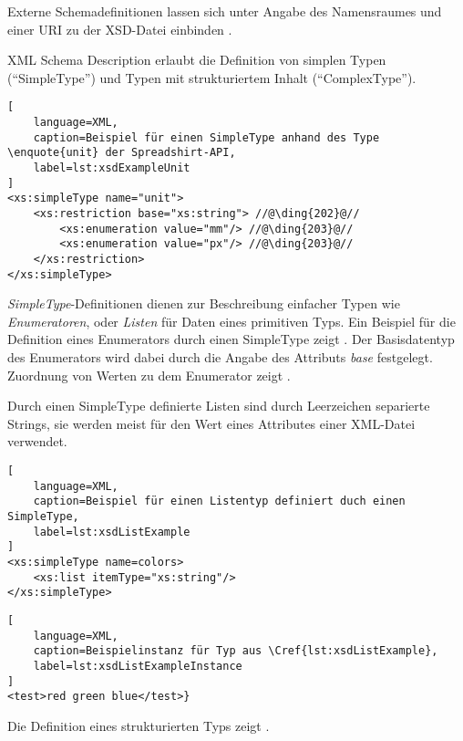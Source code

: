 Externe Schemadefinitionen lassen sich unter Angabe des Namensraumes und einer \gls{URI} zu der XSD-Datei einbinden .

XML Schema Description erlaubt die Definition von simplen Typen (\enquote{SimpleType}) und Typen mit strukturiertem Inhalt (\enquote{ComplexType}).

\begin{lstlisting}[
    language=XML,
    caption=Beispiel für einen SimpleType anhand des Type \enquote{unit} der Spreadshirt-API,
    label=lst:xsdExampleUnit
]
<xs:simpleType name="unit">
    <xs:restriction base="xs:string"> //@\ding{202}@//
        <xs:enumeration value="mm"/> //@\ding{203}@//
        <xs:enumeration value="px"/> //@\ding{203}@//
    </xs:restriction>
</xs:simpleType>
\end{lstlisting}

\emph{SimpleType}-Definitionen dienen zur Beschreibung einfacher Typen wie \emph{Enumeratoren}, oder \emph{Listen} für Daten eines primitiven Typs. Ein Beispiel für die Definition eines Enumerators durch einen SimpleType zeigt . Der Basisdatentyp des Enumerators wird dabei durch die Angabe des Attributs \emph{base}  festgelegt. Zuordnung von Werten zu dem Enumerator zeigt .

Durch einen SimpleType definierte Listen sind durch Leerzeichen separierte Strings, sie werden meist für den Wert eines Attributes einer XML-Datei verwendet. 

\begin{lstlisting}[
    language=XML,
    caption=Beispiel für einen Listentyp definiert duch einen SimpleType,
    label=lst:xsdListExample    
]
<xs:simpleType name=colors>
    <xs:list itemType="xs:string"/>
</xs:simpleType>
\end{lstlisting}

\begin{lstlisting}[
    language=XML,
    caption=Beispielinstanz für Typ aus \Cref{lst:xsdListExample},
    label=lst:xsdListExampleInstance
]
<test>red green blue</test>}
\end{lstlisting}

Die Definition eines strukturierten Typs zeigt .

